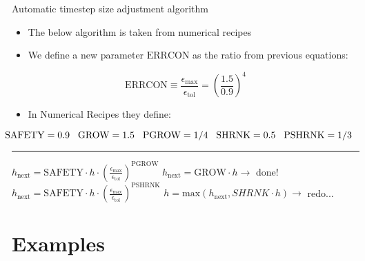 \documentclass[serif]{beamer}
\begin{document}
\begin{frame}{Automatic timestep size adjustment algorithm}
\small
  \begin{itemize}
    \item The below algorithm is taken from numerical recipes
    \item We define a new parameter $\mathrm{ERRCON}$ as the ratio from previous equations:
  \end{itemize}
  \begin{equation}
    \nonumber
    \mathrm{ERRCON} \equiv \frac{\epsilon_{\mathrm{max}}}{\epsilon_{\mathrm{tol}}} = \left(\frac{1.5}{0.9}\right)^4
  \end{equation}
  \begin{itemize}
   \item In Numerical Recipes they define:
  \end{itemize}
  \begin{equation}
   \nonumber
   \hspace{-0.5cm} \footnotesize \mathrm{SAFETY} = 0.9 \quad \mathrm{GROW} = 1.5 \quad \mathrm{PGROW} = 1/4 \quad \mathrm{SHRNK} = 0.5 \quad \mathrm{PSHRNK} = 1/3
  \end{equation} \hrule
  \vspace{-0.1cm}
\begin{multicols}{2}
\footnotesize
\begin{algorithmic}[1]
      \State $h_{\mathrm{next}} = \mathrm{SAFETY}\cdot h \cdot \left(\frac{\epsilon_{\mathrm{max}}}{\epsilon_{\mathrm{tol}}}\right)^\mathrm{PGROW}$
    \Else
      \State $h_{\mathrm{next}} = \mathrm{GROW}\cdot h \rightarrow$ \alert{done!}
    \EndIf
  \Else
    \State $h_{\mathrm{next}} = \mathrm{SAFETY}\cdot h \cdot \left(\frac{\epsilon_{\mathrm{max}}}{\epsilon_{\mathrm{tol}}}\right)^\mathrm{PSHRNK}$
    \State $h = \mathrm{max}\left(h_{\mathrm{next}},SHRNK\cdot h\right)\rightarrow$ \alert{redo...}
  \EndIf
\end{algorithmic}
\end{multicols}
\end{frame}

\section{Examples}
\end{document}
